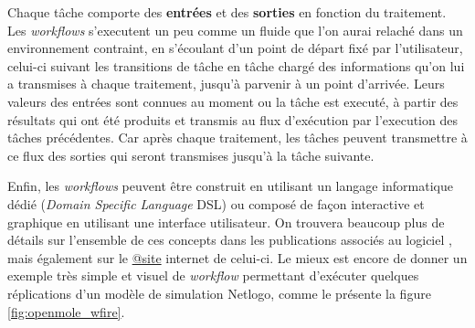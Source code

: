Chaque tâche comporte des \textbf{entrées} et des \textbf{sorties} en fonction du traitement. Les \textit{workflows} s'executent un peu comme un fluide que l'on aurai relaché dans un environnement contraint, en s'écoulant d'un point de départ fixé par l'utilisateur, celui-ci suivant les transitions de tâche en tâche chargé des informations qu'on lui a transmises à chaque traitement, jusqu'à parvenir à un point d'arrivée. Leurs valeurs des entrées sont connues au moment ou la tâche est executé, à partir des résultats qui ont été produits et transmis au flux d'exécution par l'execution des tâches précédentes. Car après chaque traitement, les tâches peuvent transmettre à ce flux des sorties qui seront transmises jusqu'à la tâche suivante.

Enfin, les \textit{workflows} peuvent être construit en utilisant un langage informatique dédié (\textit{Domain Specific Language} DSL) ou composé de façon interactive et graphique en utilisant une interface utilisateur. On trouvera beaucoup plus de détails sur l'ensemble de ces concepts dans les publications associés au logiciel \autocites{Reuillon2008a, Reuillon2013}, mais également sur le \href{http://www.openmole.org}{@site} internet de celui-ci. Le mieux est encore de donner un exemple très simple et visuel de \textit{workflow} permettant d'exécuter quelques réplications d'un modèle de simulation Netlogo, comme le présente la figure \ref{fig:openmole_wfire}. 

